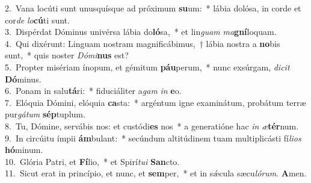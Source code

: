 {2.~}Vana locúti sunt unusquísque ad próximum \textbf{su}um:~* lábia dolósa, in corde et cor\textit{de} \textit{lo}\textbf{cú}ti sunt.\\
{3.~}Dispérdat Dóminus univérsa lábia do\textbf{ló}sa,~* et lin\textit{guam} \textit{ma}\textbf{gní}loquam.\\
{4.~}Qui dixérunt: Linguam nostram magnificábimus,~† lábia nostra a \textbf{no}bis sunt,~* quis noster \textit{Dó}\textit{mi}\textbf{nus} est?\\
{5.~}Propter misériam ínopum, et gémitum \textbf{páu}perum,~* nunc exsúrgam, \textit{di}\textit{cit} \textbf{Dó}minus.\\
{6.~}Ponam in salu\textbf{tá}ri:~* fiduciáliter a\textit{gam} \textit{in} \textbf{e}o.\\
{7.~}Elóquia Dómini, elóquia \textbf{ca}sta:~* argéntum igne examinátum, probátum terræ pur\textit{gá}\textit{tum} \textbf{sép}tuplum.\\
{8.~}Tu, Dómine, servábis nos: et custódi\textbf{es} nos~* a generatióne hac \textit{in} \textit{æ}\textbf{tér}num.\\
{9.~}In circúitu ímpii \textbf{ám}bulant:~* secúndum altitúdinem tuam multiplicásti fí\textit{li}\textit{os} \textbf{hó}minum.\\
{10.~}Glória Patri, et \textbf{Fí}lio,~* et Spirí\textit{tu}\textit{i} \textbf{San}cto.\\
{11.~}Sicut erat in princípio, et nunc, et \textbf{sem}per,~* et in sǽcula sæcu\textit{ló}\textit{rum}. \textbf{A}men.\\
